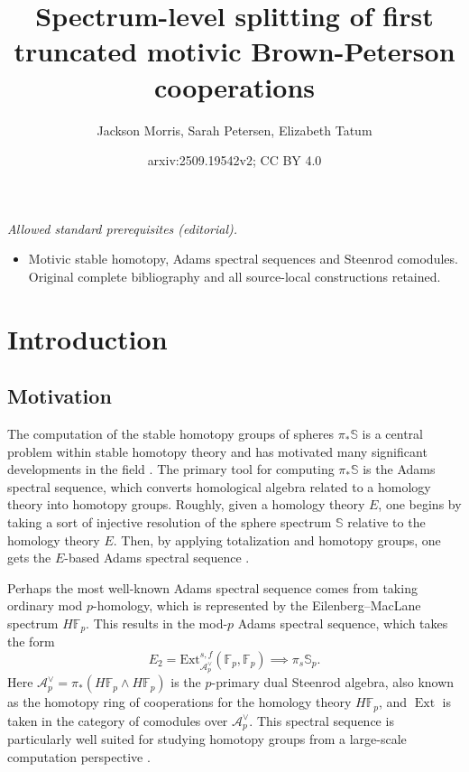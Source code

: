 \documentclass{amsart}
\title{Spectrum-level splitting of first truncated motivic Brown-Peterson cooperations}
\author{Jackson Morris, Sarah Petersen, Elizabeth Tatum}
\date{arxiv:2509.19542v2; CC BY 4.0}
\theoremstyle{plain}
\numberwithin{theorem}{section}
\numberwithin{equation}{section}
\numberwithin{figure}{section}
\DeclareMathOperator{\Ext}{Ext}
\newcommand{\mS}{{\mathbb S}}
\newcommand{\0}{\langle 0 \rangle }
\begin{document}
\maketitle
\noindent\textit{Allowed standard prerequisites (editorial).}\begin{itemize}
\item Motivic stable homotopy, Adams spectral sequences and Steenrod comodules. Original complete bibliography and all source-local constructions retained.
\end{itemize}\medskip
\section{Introduction} \label{sec:Intro}
\subsection{Motivation} 
The computation of the stable homotopy groups of spheres $\pi_* \mS$ is a central problem within stable homotopy theory and has motivated many significant developments in the field \cite{Adams66, DevHopSmi88,IsaWanXu23}. The primary tool for computing $\pi_*\mathbb{S}$ is the Adams spectral sequence, which converts homological algebra related to a homology theory into homotopy groups. Roughly, given a homology theory $E$, one begins by taking a sort of injective resolution of the sphere spectrum $\mathbb{S}$ relative to the homology theory $E$. Then, by applying totalization and homotopy groups, one gets the $E$-based Adams spectral sequence \cite{Rav86}.

Perhaps the most well-known Adams spectral sequence comes from taking ordinary mod $p$-homology, which is represented by the Eilenberg--MacLane spectrum $H\mathbb{F}_p$. This results in the mod-$p$ Adams spectral sequence, which takes the form
\[E_2 = \text{Ext}^{s,f}_{\mathcal{A}_p^\vee}(\mathbb{F}_p, \mathbb{F}_p) \implies \pi_s\mathbb{S}_p.\]
Here $\mathcal{A}_p^\vee = \pi_*(H\mathbb{F}_p \wedge H\mathbb{F}_p)$ is the $p$-primary dual Steenrod algebra, also known as the homotopy ring of cooperations for the homology theory $H\mathbb{F}_p$, and $\Ext$ is taken in the category of comodules over $\mathcal{A}^\vee_p$. This spectral sequence is particularly well suited for studying homotopy groups from a large-scale computation perspective \cite{linWanXu25}. 
\end{document}
